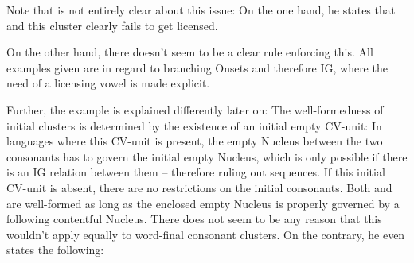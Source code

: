 \begin{structure}{\ti{*[Sa:kf]}}
  \wordstart
  \emptyV[gov]
  \fen
\end{structure}

Note that \cite{scheer2004} is not entirely clear about this issue:
On the one hand, he states that
and this cluster clearly fails to get licensed.


On the other hand, there doesn't seem to be a clear rule enforcing this.
All examples given are in regard to branching Onsets and therefore \gls{IG},
where the need of a licensing vowel is made explicit.

Further, the  example is explained differently later on:
The well-formedness of initial  clusters is determined by the existence
of an initial empty CV-unit:
In languages where this CV-unit is present, the empty Nucleus between the two consonants
has to govern the initial empty Nucleus, which is only possible if there is
an \gls{IG} relation between them -- therefore ruling out  sequences.
If this initial CV-unit is absent, there are no restrictions on the initial consonants.
Both  and  are well-formed as long as the enclosed empty Nucleus
is properly governed by a following contentful Nucleus.
There does not seem to be any reason that this wouldn't apply equally to word-final
consonant clusters. On the contrary, he even states the following:
